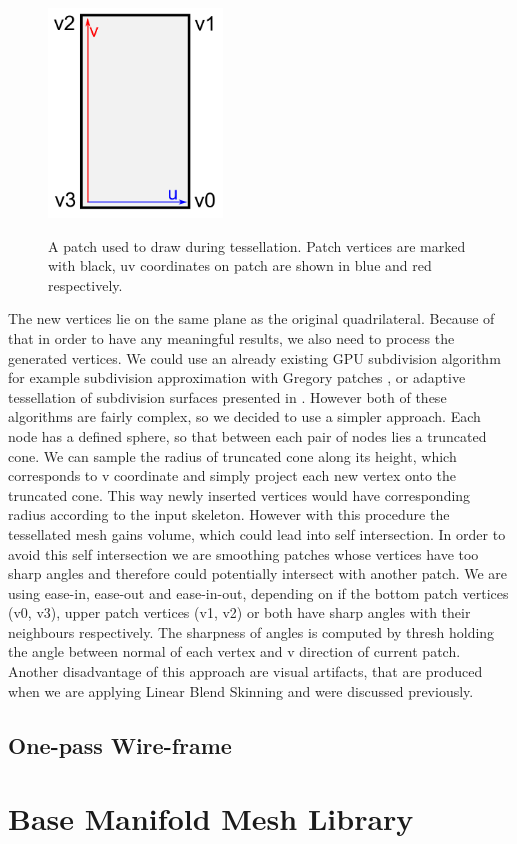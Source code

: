 \begin{figure}[h]
    \centering
    \includegraphics[height=15em]{images/tess_patch}
    \label{fig:tess_patch}
    \caption[Tessellation patch]{A patch used to draw during tessellation. Patch vertices are marked with black, uv coordinates on patch are shown in blue and red respectively.}
\end{figure}

The new vertices lie on the same plane as the original quadrilateral.
Because of that in order to have any meaningful results, we also need to process the generated vertices.
We could use an already existing GPU subdivision algorithm for example subdivision approximation with Gregory patches \cite{gregory_patch}, or adaptive tessellation of subdivision surfaces presented in \cite{gpu_gems_2}.
However both of these algorithms are fairly complex, so we decided to use a simpler approach.
Each node has a defined sphere, so that between each pair of nodes lies a truncated cone.
We can sample the radius of truncated cone along its height, which corresponds to v coordinate and simply project each new vertex onto the truncated cone.
This way newly inserted vertices would have corresponding radius according to the input skeleton.
However with this procedure the tessellated mesh gains volume, which could lead into self intersection.
In order to avoid this self intersection we are smoothing patches whose vertices have too sharp angles and therefore could potentially intersect with another patch.
We are using ease-in, ease-out and ease-in-out, depending on if the bottom patch vertices (v0, v3), upper patch vertices (v1, v2) or both have sharp angles with their neighbours respectively.
The sharpness of angles is computed by thresh holding the angle between normal of each vertex and v direction of current patch.
Another disadvantage of this approach are visual artifacts, that are produced when we are applying Linear Blend Skinning and were discussed previously.

\subsection{One-pass Wire-frame}



\section{Base Manifold Mesh Library}